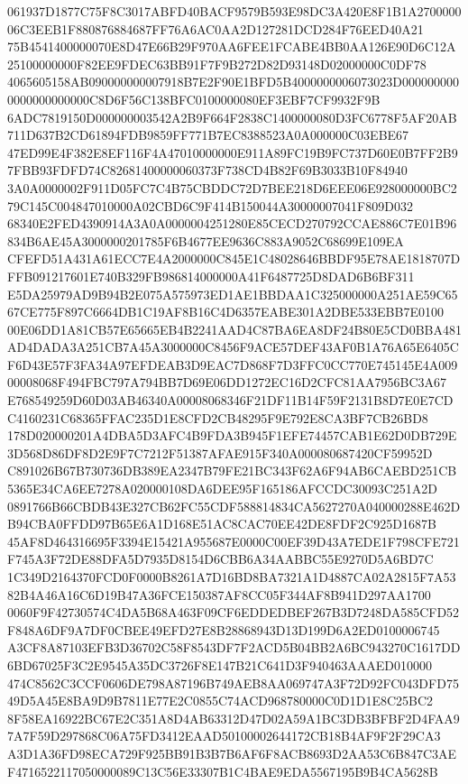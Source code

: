 \documentclass[UTF8,fontset=fandol,zihao=-4,a4paper]{ctexart}
\begin{document}
{{061937D1877C75F8C3017ABFD40BACF9579B593E98DC3A420E8F1B1A270000006C3EEB1F880876884687FF76A6AC0AA2D127281DCD284F76EED40A21
75B4541400000070E8D47E66B29F970AA6FEE1FCABE4BB0AA126E90D6C12A25100000000F82EE9FDEC63BB91F7F9B272D82D93148D02000000C0DF78
4065605158AB090000000007918B7E2F90E1BFD5B4000000006073023D0000000000000000000000C8D6F56C138BFC0100000080EF3EBF7CF9932F9B
6ADC7819150D000000003542A2B9F664F2838C1400000080D3FC6778F5AF20AB711D637B2CD61894FDB9859FF771B7EC8388523A0A000000C03EBE67
47ED99E4F382E8EF116F4A47010000000E911A89FC19B9FC737D60E0B7FF2B97FBB93FDFD74C82681400000060373F738CD4B82F69B3033B10F84940
3A0A0000002F911D05FC7C4B75CBDDC72D7BEE218D6EEE06E928000000BC279C145C004847010000A02CBD6C9F414B150044A30000007041F809D032
68340E2FED4390914A3A0A0000004251280E85CECD270792CCAE886C7E01B96834B6AE45A3000000201785F6B4677EE9636C883A9052C68699E109EA
CFEFD51A431A61ECC7E4A2000000C845E1C48028646BBDF95E78AE1818707DFFB091217601E740B329FB986814000000A41F6487725D8DAD6B6BF311
E5DA25979AD9B94B2E075A575973ED1AE1BBDAA1C325000000A251AE59C6567CE775F897C6664DB1C19AF8B16C4D6357EABE301A2DBE533EBB7E0100
00E06DD1A81CB57E65665EB4B2241AAD4C87BA6EA8DF24B80E5CD0BBA481AD4DADA3A251CB7A45A3000000C8456F9ACE57DEF43AF0B1A76A65E6405C
F6D43E57F3FA34A97EFDEAB3D9EAC7D868F7D3FFC0CC770E745145E4A00900008068F494FBC797A794BB7D69E06DD1272EC16D2CFC81AA7956BC3A67
E768549259D60D03AB46340A00008068346F21DF11B14F59F2131B8D7E0E7CDC4160231C68365FFAC235D1E8CFD2CB48295F9E792E8CA3BF7CB26BD8
178D020000201A4DBA5D3AFC4B9FDA3B945F1EFE74457CAB1E62D0DB729E3D568D86DF8D2E9F7C7212F51387AFAE915F340A000080687420CF59952D
C891026B67B730736DB389EA2347B79FE21BC343F62A6F94AB6CAEBD251CB5365E34CA6EE7278A020000108DA6DEE95F165186AFCCDC30093C251A2D
0891766B66CBDB43E327CB62FC55CDF588814834CA5627270A040000288E462DB94CBA0FFDD97B65E6A1D168E51AC8CAC70EE42DE8FDF2C925D1687B
45AF8D464316695F3394E15421A955687E0000C00EF39D43A7EDE1F798CFE721F745A3F72DE88DFA5D7935D8154D6CBB6A34AABBC55E9270D5A6BD7C
1C349D2164370FCD0F0000B8261A7D16BD8BA7321A1D4887CA02A2815F7A5382B4A46A16C6D19B47A36FCE150387AF8CC05F344AF8B941D297AA1700
0060F9F42730574C4DA5B68A463F09CF6EDDEDBEF267B3D7248DA585CFD52F848A6DF9A7DF0CBEE49EFD27E8B28868943D13D199D6A2ED0100006745
A3CF8A87103EFB3D36702C58F8543DF7F2ACD5B04BB2A6BC943270C1617DD6BD67025F3C2E9545A35DC3726F8E147B21C641D3F940463AAAED010000
474C8562C3CCF0606DE798A87196B749AEB8AA069747A3F72D92FC043DFD7549D5A45E8BA9D9B7811E77E2C0855C74ACD968780000C0D1D1E8C25BC2
8F58EA16922BC67E2C351A8D4AB63312D47D02A59A1BC3DB3BFBF2D4FAA97A7F59D297868C06A75FD3412EAAD50100002644172CB18B4AF9F2F29CA3
A3D1A36FD98ECA729F925BB91B3B7B6AF6F8ACB8693D2AA53C6B847C3AEF4716522117050000089C13C56E33307B1C4BAE9EDA5567195B9B4CA5628B
}}
\end{document}
